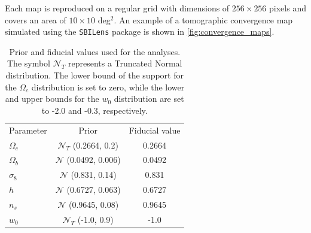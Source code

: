 \documentclass{aa}
\begin{document}
Each map is reproduced on a regular grid with dimensions of $256 \times 256$ pixels and covers an area of $10\times 10$ deg$^2$.  An example of a tomographic convergence map simulated using the \texttt{SBILens} package is shown in \autoref{fig:convergence_maps}. 
\begin{table}
	\begin{center}
    	\begin{tabular}{lcc} 
    		\hline \hline
    		Parameter  & Prior & Fiducial value \\
    		$\Omega_c$ & $\mathcal{N}_T$ (0.2664, 0.2) & 0.2664 \\
    		$\Omega_b$ & $\mathcal{N}$ (0.0492, 0.006) & 0.0492 \\
    		$\sigma_8$ & $\mathcal{N}$ (0.831, 0.14) & 0.831 \\
    		$h$ & $\mathcal{N}$ (0.6727, 0.063) & 0.6727\\
    		$n_s$ & $\mathcal{N}$ (0.9645, 0.08) & 0.9645 \\
    		$w_{0}$ &  $\mathcal{N}_T$ (-1.0, 0.9) &  -1.0 \\
    		\hline
    	\end{tabular}
        \caption{ Prior and fiducial values used for the analyses. 
        The symbol $\mathcal{N}_T$ represents a Truncated Normal distribution. The lower bound of the support for the $\Omega_c$ distribution is set to zero, while the lower and upper bounds for the $w_0$ distribution are set to -2.0 and -0.3, respectively.}
	    \label{tab:prior}
    \end{center}
\end{table}
\end{document}
